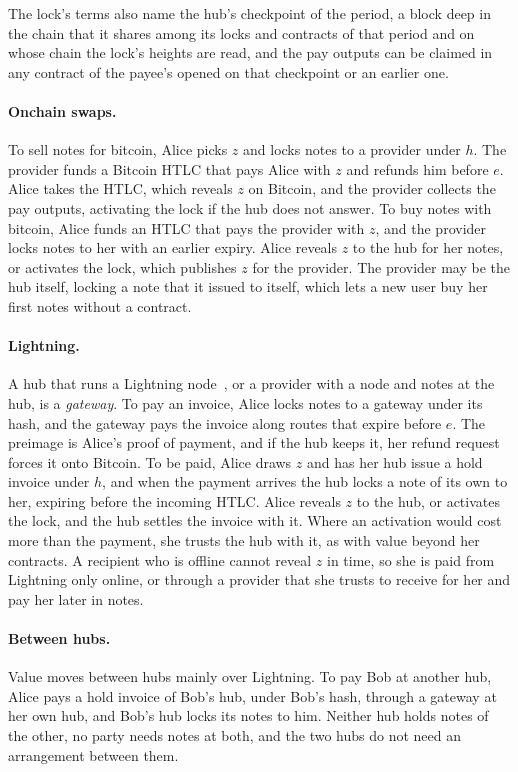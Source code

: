 \documentclass[11pt]{article}
\begin{document}
The lock's terms also name the hub's checkpoint of the period, a block deep in the chain that it shares among its locks and contracts of that period and on whose chain the lock's heights are read, and the pay outputs can be claimed in any contract of the payee's opened on that checkpoint or an earlier one.

\paragraph{Onchain swaps.} To sell notes for bitcoin, Alice picks $z$ and locks notes to a provider under $h$. The provider funds a Bitcoin HTLC that pays Alice with $z$ and refunds him before $e$. Alice takes the HTLC, which reveals $z$ on Bitcoin, and the provider collects the pay outputs, activating the lock if the hub does not answer. To buy notes with bitcoin, Alice funds an HTLC that pays the provider with $z$, and the provider locks notes to her with an earlier expiry. Alice reveals $z$ to the hub for her notes, or activates the lock, which publishes $z$ for the provider. The provider may be the hub itself, locking a note that it issued to itself, which lets a new user buy her first notes without a contract.

\paragraph{Lightning.} A hub that runs a Lightning node~\cite{lightning}, or a provider with a node and notes at the hub, is a \emph{gateway}. To pay an invoice, Alice locks notes to a gateway under its hash, and the gateway pays the invoice along routes that expire before $e$. The preimage is Alice's proof of payment, and if the hub keeps it, her refund request forces it onto Bitcoin. To be paid, Alice draws $z$ and has her hub issue a hold invoice under $h$, and when the payment arrives the hub locks a note of its own to her, expiring before the incoming HTLC. Alice reveals $z$ to the hub, or activates the lock, and the hub settles the invoice with it. Where an activation would cost more than the payment, she trusts the hub with it, as with value beyond her contracts. A recipient who is offline cannot reveal $z$ in time, so she is paid from Lightning only online, or through a provider that she trusts to receive for her and pay her later in notes.

\paragraph{Between hubs.} Value moves between hubs mainly over Lightning. To pay Bob at another hub, Alice pays a hold invoice of Bob's hub, under Bob's hash, through a gateway at her own hub, and Bob's hub locks its notes to him. Neither hub holds notes of the other, no party needs notes at both, and the two hubs do not need an arrangement between them.
\end{document}
